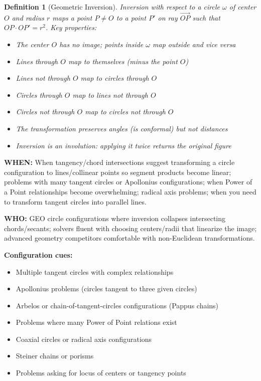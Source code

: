 \documentclass[12pt]{article}
\newtheorem{definition}{Definition}[section]
\begin{document}
\begin{definition}[Geometric Inversion]
Inversion with respect to a circle $\omega$ of center $O$ and radius $r$ maps a point $P \neq O$ to a point $P'$ on ray $\overrightarrow{OP}$ such that $OP \cdot OP' = r^2$. Key properties:
\begin{itemize}
    \item The center $O$ has no image; points inside $\omega$ map outside and vice versa
    \item Lines through $O$ map to themselves (minus the point $O$)
    \item Lines not through $O$ map to circles through $O$
    \item Circles through $O$ map to lines not through $O$
    \item Circles not through $O$ map to circles not through $O$
    \item The transformation preserves angles (is conformal) but not distances
    \item Inversion is an involution: applying it twice returns the original figure
\end{itemize}
\end{definition}

\textbf{WHEN:} When tangency/chord intersections suggest transforming a circle configuration to lines/collinear points so segment products become linear; problems with many tangent circles or Apollonius configurations; when Power of a Point relationships become overwhelming; radical axis problems; when you need to transform tangent circles into parallel lines.

\textbf{WHO:} GEO circle configurations where inversion collapses intersecting chords/secants; solvers fluent with choosing centers/radii that linearize the image; advanced geometry competitors comfortable with non-Euclidean transformations.

\textbf{Configuration cues:}
\begin{itemize}
    \item Multiple tangent circles with complex relationships
    \item Apollonius problems (circles tangent to three given circles)
    \item Arbelos or chain-of-tangent-circles configurations (Pappus chains)
    \item Problems where many Power of Point relations exist
    \item Coaxial circles or radical axis configurations
    \item Steiner chains or porisms
    \item Problems asking for locus of centers or tangency points
\end{itemize}
\end{document}
